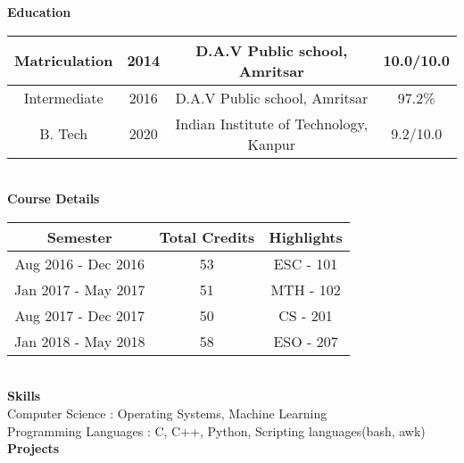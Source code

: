 \documentclass{article}
\begin{document}
\begin{flushleft}
\textbf{Education} \\
\vspace{3mm}
\begin{tabular}{ |c|c|c|c| }
 \hline
 Matriculation & 2014 & D.A.V Public school, Amritsar & 10.0/10.0 \\
 \hline
 Intermediate & 2016 & D.A.V Public school, Amritsar & 97.2\% \\
 \hline
 B. Tech & 2020 & Indian Institute of Technology, Kanpur  & 9.2/10.0 \\
 \hline
\end{tabular}
\\
\vspace{7mm}
\textbf{Course Details} \\
\vspace{3mm}
\begin{tabular}{ |c|c|c| }
 \hline
 Semester & Total Credits & Highlights \\
 \hline
 Aug 2016 - Dec 2016 & 53 & ESC - 101 \\
 \hline
 Jan 2017 - May 2017 & 51 & MTH - 102 \\
 \hline
 Aug 2017 - Dec 2017 & 50 & CS - 201 \\
 \hline
 Jan 2018 - May 2018 & 58 & ESO - 207 \\
 \hline
\end{tabular}
\\
\vspace{7mm}
\textbf{Skills} \\
\vspace{3mm}
Computer Science \hspace{11mm} : \hspace{3mm} Operating Systems, Machine Learning \\
Programming Languages \hspace{1mm} : \hspace{3mm} C, C++, Python, Scripting languages(bash, awk) \\
\vspace{7mm}
\textbf{Projects} \\


\end{flushleft}
\end{document}
